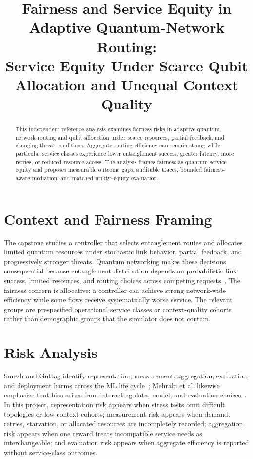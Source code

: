 \documentclass[10pt,conference]{IEEEtran}
\title{Fairness and Service Equity in Adaptive Quantum-Network Routing:\\Service Equity Under Scarce Qubit Allocation and Unequal Context Quality}
\author{\IEEEauthorblockN{Piter Z. Garcia Bautista}\IEEEauthorblockA{DSCI 602 -- Applied Data Science II\\Capstone: Fairness-Aware Adaptive Routing for Quantum Networks\\Focus Area: Fairness}}
\begin{document}
\maketitle
\begin{abstract}
This independent reference analysis examines fairness risks in adaptive quantum-network routing and qubit allocation under scarce resources, partial feedback, and changing threat conditions. Aggregate routing efficiency can remain strong while particular service classes experience lower entanglement success, greater latency, more retries, or reduced resource access. The analysis frames fairness as quantum service equity and proposes measurable outcome gaps, auditable traces, bounded fairness-aware mediation, and matched utility--equity evaluation.
\end{abstract}
\section{Context and Fairness Framing}
The capstone studies a controller that selects entanglement routes and allocates limited quantum resources under stochastic link behavior, partial feedback, and progressively stronger threats. Quantum networking makes these decisions consequential because entanglement distribution depends on probabilistic link success, limited resources, and routing choices across competing requests~\cite{wehner2018quantum,pant2019routing}. The fairness concern is allocative: a controller can achieve strong network-wide efficiency while some flows receive systematically worse service. The relevant groups are prespecified operational service classes or context-quality cohorts rather than demographic groups that the simulator does not contain.
\section{Risk Analysis}
Suresh and Guttag identify representation, measurement, aggregation, evaluation, and deployment harms across the ML life cycle~\cite{suresh2021harm}; Mehrabi et al. likewise emphasize that bias arises from interacting data, model, and evaluation choices~\cite{mehrabi2021survey}. In this project, representation risk appears when stress tests omit difficult topologies or low-context cohorts; measurement risk appears when demand, retries, starvation, or allocated resources are incompletely recorded; aggregation risk appears when one reward treats incompatible service needs as interchangeable; and evaluation risk appears when aggregate efficiency is reported without service-class outcomes.
\end{document}
